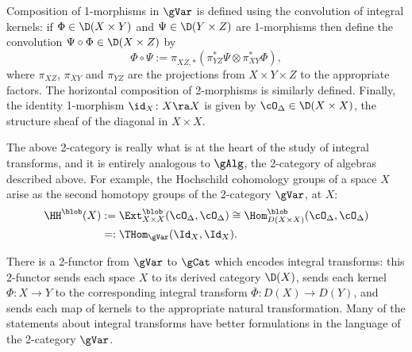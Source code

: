 Composition of 1-morphisms in $\gVar$ is defined using the convolution
of integral kernels: if $\Phi\in \D(X\times Y)$ and $\Psi\in
\D(Y\times Z)$ are 1-morphisms then define the convolution
$\Psi\circ\Phi\in\D(X\times Z)$ by
\[ \Phi\circ \Psi := \pi^{}_{XZ, *} ( \pi_{YZ}^* \Psi \otimes
\pi_{XY}^* \Phi), \] where $\pi_{XZ}$, $\pi_{XY}$ and $\pi_{YZ}$ are the
projections from $X\times Y\times Z$ to the appropriate factors.  The
horizontal composition of 2-morphisms is similarly defined.  Finally,
the identity 1-morphism $\id_X\colon X\ra X$ is given by
$\cO_{\Delta}\in \D(X\times X)$, the structure sheaf of the diagonal
in $X\times X$.


The above 2-category is really what is at the heart of the study of
integral transforms, and it is entirely analogous to $\gAlg$, the
2-category of algebras described above.  For example, the Hochschild
cohomology groups of a space $X$ arise as the second homotopy groups
of the 2-category $\gVar$, at $X$:
\begin{align*}
  \HH^\blob(X) &:=\Ext_{X\times X}^\blob(\cO_\Delta,\cO_\Delta)
  \cong \Hom^\blob_{D(X\times X)}(\cO_\Delta,\cO_\Delta)\\
  &=:\THom_{\gVar}(\Id_X,\Id_X).
\end{align*}

There is a 2-functor from $\gVar$ to $\gCat$ which encodes integral
transforms: this 2-functor sends each space $X$ to its derived
category $\D(X)$, sends each kernel $\Phi\colon X\to Y$ to the
corresponding integral transform $\overline \Phi\colon D(X)\to D(Y)$,
and sends each map of kernels to the appropriate natural
transformation.  Many of the statements about integral transforms have
better formulations in the language of the 2-category $\gVar$.
